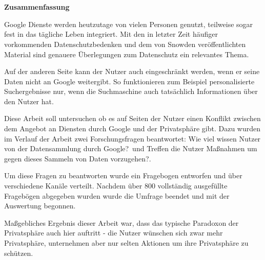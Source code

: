 %
% 

\chapter*{\ }


\begin{center}
	\begin{large}
		\textbf{Zusammenfassung}
	\end{large}
\end{center}
\vspace{0.75em}
Google Dienste werden heutzutage von vielen Personen genutzt, teilweise sogar fest in das tägliche Leben integriert. 
Mit den in letzter Zeit häufiger vorkommenden Datenschutzbedenken und dem von Snowden veröffentlichten Material sind genauere Überlegungen zum Datenschutz ein relevantes Thema.

Auf der anderen Seite kann der Nutzer auch eingeschränkt werden, wenn er seine Daten nicht an Google weitergibt. So funktionieren zum Beispiel personalisierte Suchergebnisse nur, wenn die Suchmaschine auch tatsächlich Informationen über den Nutzer hat.

Diese Arbeit soll untersuchen ob es auf Seiten der Nutzer einen Konflikt zwischen dem Angebot an Diensten durch Google und der Privatsphäre gibt. Dazu wurden im Verlauf der Arbeit zwei Forschungsfragen beantwortet: \glqq Wie viel wissen Nutzer von der Datensammlung durch Google?\grqq\ und \glqq Treffen die Nutzer Maßnahmen um gegen dieses Sammeln von Daten vorzugehen?\grqq .

Um diese Fragen zu beantworten wurde ein Fragebogen entworfen und über verschiedene Kanäle verteilt. Nachdem über 800 vollständig ausgefüllte Fragebögen abgegeben wurden wurde die Umfrage beendet und mit der Auswertung begonnen. 

Maßgebliches Ergebnis dieser Arbeit war, dass das typische Paradoxon der Privatsphäre auch hier auftritt - die Nutzer wünschen sich zwar mehr Privatsphäre, unternehmen aber nur selten Aktionen um ihre Privatsphäre zu schützen.

\chapter*{\ }

